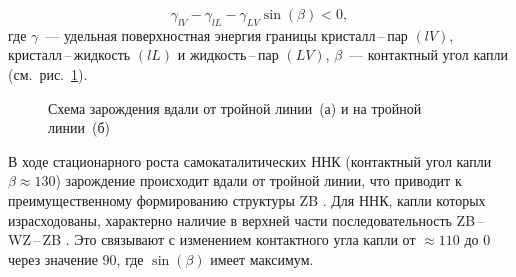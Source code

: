\begin{equation} \label{eq:eq_1} \gamma_{lV} - \gamma_{lL} - \gamma_{LV}
\sin(\beta) < 0, \end{equation} где \(\gamma\)~--- удельная поверхностная
энергия границы кристалл\,--\,пар \((lV)\), кристалл\,--\,жидкость \((lL)\) и
жидкость\,--\,пар \((LV)\), \(\beta\)~--- контактный угол капли
(см.~рис.~\cref{fig:Image_7}).

\begin{figure}[ht]   \caption{Схема зарождения вдали от тройной линии~(а) и
на тройной линии~(б) \cite{Glas2007}} \label{fig:Image_7} \end{figure}

В ходе стационарного роста самокаталитических ННК (контактный угол капли
\(\beta\approx 130\){\textdegree}) зарождение происходит вдали от тройной
линии, что приводит к преимущественному формированию структуры ZB
\cite{Cirlin2010}. Для ННК, капли которых израсходованы, характерно наличие в
верхней части последовательность ZB\,--\,WZ\,--\,ZB \cite{Spirkoska2009,
Ambrosini2011}. Это связывают с изменением контактного угла капли от \(\approx
110\){\textdegree} до 0{\textdegree} через значение 90{\textdegree}, где
\(\sin(\beta)\) имеет максимум.

\FloatBarrier
